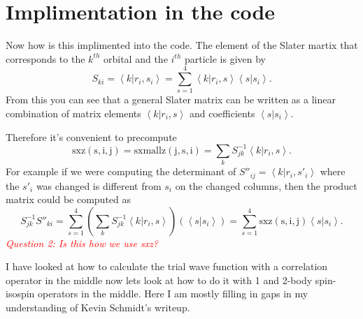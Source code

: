 \documentclass[12pt]{extarticle}
\newcommand{\braket}[2]{\left< #1 | #2 \right>}
\newcommand{\mycolor}[1]{\textit{\textcolor{red}{#1}}}
\begin{document}
\section{Implimentation in the code}
Now how is this implimented into the code. The element of the Slater martix that corresponds to the $k^{th}$ orbital and the $i^{th}$ particle is given by
\begin{equation}
  S_{ki} = \braket{k}{r_i,s_i} = \sum_{s=1}^4 \braket{k}{r_i,s}\braket{s}{s_i}.
\end{equation}
From this you can see that a general Slater matrix can be written as a linear combination of matrix elements $\braket{k}{r_i,s}$ and coefficients $\braket{s}{s_i}$.

Therefore it's convenient to precompute
\begin{equation}
  \mathrm{sxz(s,i,j) = sxmallz(j,s,i)} = \sum_k S^{-1}_{jk} \braket{k}{r_i,s}.
\end{equation}
For example if we were computing the determinant of $S''_{ij} = \braket{k}{r_i,s'_i}$ where the $s'_i$ was changed is different from $s_i$ on the changed columns, then the product matrix could be computed as
\begin{equation}
  S^{-1}_{jk}S''_{ki} = \sum_{s=1}^4 \left(\sum_k S^{-1}_{jk} \braket{k}{r_i,s}\right) \left(\braket{s}{s_i}\right) = \sum_{s=1}^4 \mathrm{sxz(s,i,j)} \braket{s}{s_i}.
  \label{equ:usesxz}
\end{equation}
\mycolor{Question 2: Is this how we use sxz?}

I have looked at how to calculate the trial wave function with a correlation operator in the middle now lets look at how to do it with 1 and 2-body spin-isospin operators in the middle. Here I am mostly filling in gaps in my understanding of Kevin Schmidt's writeup.
\end{document}
